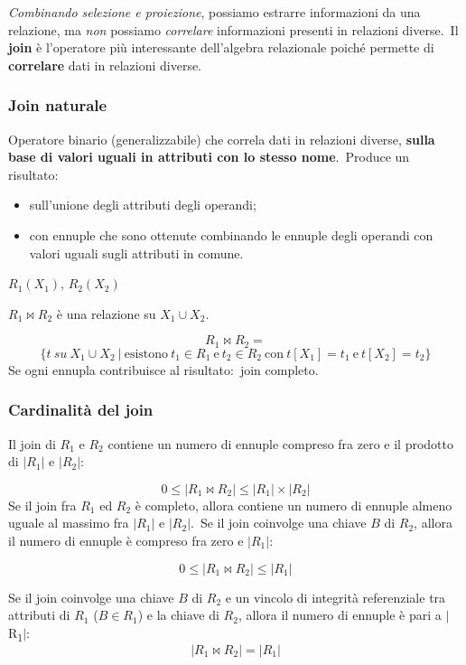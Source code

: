 \textit{Combinando selezione e proiezione}, possiamo estrarre informazioni da una relazione, ma \textit{non} possiamo \textit{correlare} informazioni presenti in relazioni diver\-se.\
Il \textbf{join} è l'operatore più interessante dell'algebra relazionale poiché permette di \textbf{correlare} dati in relazioni diverse.

\subsubsection{Join naturale}
Operatore binario (generalizzabile) che correla dati in relazioni diverse, \textbf{sulla base di valori uguali in attributi con lo stesso nome}.\
Produce un risultato:
\begin{itemize}
	\item sull'unione degli attributi degli operandi;
	\item con ennuple che sono ottenute combinando le ennuple degli operandi con valori uguali sugli attributi in comune.
\end{itemize}
$R_1(X_1)$, $R_2(X_2)$

\noindent $R_1 \Join R_2$ è una relazione su $X_1 \cup X_2$.

\[R_1 \Join R_2 =\]
\[     \{ t\ su\ X_1 \cup X_2\ |\ \mathrm{esistono}\ t_1 \in R_1\ \mathrm{e}\ t_2\in R_2\ \mathrm{con}\ t[X_1] = t_1\ \mathrm{e}\ t[X_2] = t_2 \}
\]
Se ogni ennupla contribuisce al risultato:\ join completo.

\subsubsection{Cardinalità del join}

Il join di $R_1$ e $R_2$ contiene un numero di ennuple compreso fra zero e il prodotto
di $|R_1|$ e $|R_2|$:

\[ 0 \leq |R_1 \Join R_2 | \leq | R_1 | \times | R_2 | \]
Se il join fra $R_1$ ed $R_2$ è completo, allora contiene un numero di ennuple almeno uguale al massimo fra $|R_1|$ e $|R_2|$.\
Se il join coinvolge una chiave $B$ di $R_2$, allora il numero di ennuple è compreso fra zero e $|R_1|$:

\[ 0 \leq |R_1 \Join R_2 | \leq | R_1 |\]

\noindent Se il join coinvolge una chiave $B$ di $R_2$ e un vincolo di integrità referenziale tra attributi di $R_1$ ($B \in R_1$) e la chiave di $R_2$, allora il numero di ennuple è pari a $|$R\textsubscript{1}$|$:
\[|R_1 \Join R_2 | = | R_1 | \]

